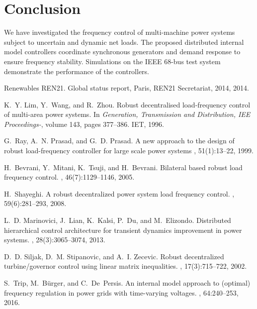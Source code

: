 \documentclass[journal]{IEEEtran}
\begin{document}
\section{Conclusion}
We have investigated the frequency control of multi-machine power systems subject to uncertain and dynamic net loads.
The proposed distributed internal model controllers coordinate synchronous generators and demand response to ensure frequency stability.
Simulations on the IEEE 68-bus test system demonstrate the performance of the controllers.

\begin{thebibliography}{10}

Renewables REN21.
\newblock Global status report, {P}aris, {REN}21 {S}ecretariat, 2014, 2014.

K.~Y. Lim, Y.~Wang, and R.~Zhou.
\newblock Robust decentralised load-frequency control of multi-area power
  systems.
\newblock In {\em Generation, Transmission and Distribution, IEE Proceedings-},
  volume 143, pages 377--386. IET, 1996.

G.~Ray, A.~N. Prasad, and G.~D. Prasad.
\newblock A new approach to the design of robust load-frequency controller for large scale power systems
,
  51(1):13--22, 1999.

H.~Bevrani, Y.~Mitani, K.~Tsuji, and H.~Bevrani.
\newblock Bilateral based robust load frequency control.
, 46(7):1129--1146, 2005.

H.~Shayeghi.
\newblock A robust decentralized power system load frequency control.
, 59(6):281--293, 2008.

L.~D. Marinovici, J.~Lian, K.~Kalsi, P.~Du, and M.~Elizondo.
\newblock Distributed hierarchical control architecture for transient dynamics improvement in power systems.
, 28(3):3065--3074, 2013.

D.~D. Siljak, D.~M. Stipanovic, and A.~I. Zecevic.
\newblock Robust decentralized turbine/governor control using linear matrix inequalities.
, 17(3):715--722, 2002.

S.~Trip, M.~B{\"u}rger, and C.~De~Persis.
\newblock An internal model approach to (optimal) frequency regulation in power
  grids with time-varying voltages.
, 64:240--253, 2016.


\end{thebibliography}
\end{document}
